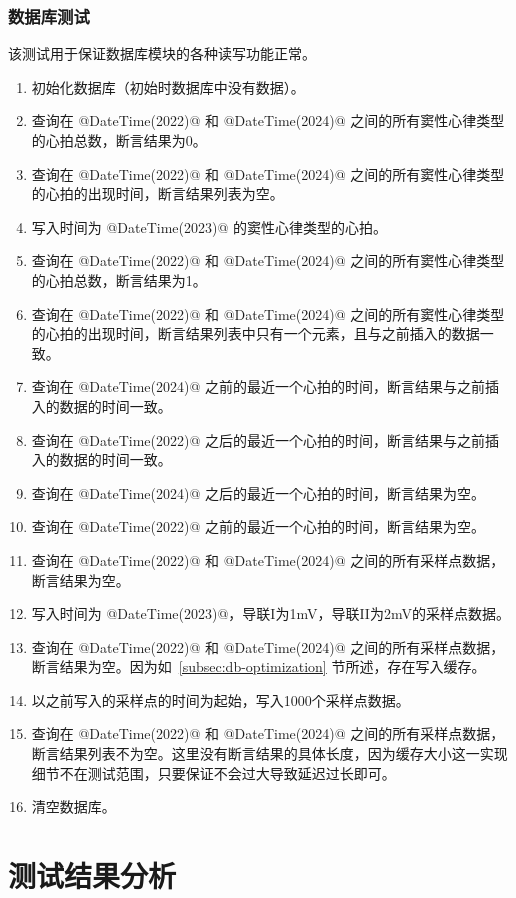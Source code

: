 \subsubsection{数据库测试}

该测试用于保证数据库模块的各种读写功能正常。

\begin{enumerate}
    \item 初始化数据库（初始时数据库中没有数据）。
    \item 查询在 @DateTime(2022)@ 和 @DateTime(2024)@ 之间的所有窦性心律类型的心拍总数，断言结果为0。
    \item 查询在 @DateTime(2022)@ 和 @DateTime(2024)@ 之间的所有窦性心律类型的心拍的出现时间，断言结果列表为空。
    \item 写入时间为 @DateTime(2023)@ 的窦性心律类型的心拍。
    \item 查询在 @DateTime(2022)@ 和 @DateTime(2024)@ 之间的所有窦性心律类型的心拍总数，断言结果为1。
    \item 查询在 @DateTime(2022)@ 和 @DateTime(2024)@ 之间的所有窦性心律类型的心拍的出现时间，断言结果列表中只有一个元素，且与之前插入的数据一致。
    \item 查询在 @DateTime(2024)@ 之前的最近一个心拍的时间，断言结果与之前插入的数据的时间一致。
    \item 查询在 @DateTime(2022)@ 之后的最近一个心拍的时间，断言结果与之前插入的数据的时间一致。
    \item 查询在 @DateTime(2024)@ 之后的最近一个心拍的时间，断言结果为空。
    \item 查询在 @DateTime(2022)@ 之前的最近一个心拍的时间，断言结果为空。
    \item 查询在 @DateTime(2022)@ 和 @DateTime(2024)@ 之间的所有采样点数据，断言结果为空。
    \item 写入时间为 @DateTime(2023)@，导联I为1mV，导联II为2mV的采样点数据。
    \item 查询在 @DateTime(2022)@ 和 @DateTime(2024)@ 之间的所有采样点数据，断言结果为空。因为如~\ref{subsec:db-optimization} 节所述，存在写入缓存。
    \item 以之前写入的采样点的时间为起始，写入1000个采样点数据。
    \item 查询在 @DateTime(2022)@ 和 @DateTime(2024)@ 之间的所有采样点数据，断言结果列表不为空。这里没有断言结果的具体长度，因为缓存大小这一实现细节不在测试范围，只要保证不会过大导致延迟过长即可。
    \item 清空数据库。
\end{enumerate}


\section{测试结果分析}\label{sec:test-result}

